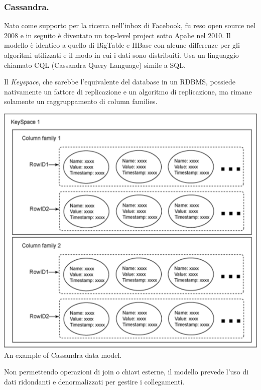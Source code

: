 \documentclass[a4page, 11pt]{article}
\begin{document}
\subsubsection*{Cassandra.}
Nato come supporto per la ricerca nell'inbox di Facebook, fu reso open source nel 2008 e in seguito è diventato un top-level project sotto Apahe nel 2010.
Il modello è identico a quello di BigTable e HBase con alcune differenze per gli algoritmi utilizzati e il modo in cui i dati sono distribuiti.
Usa un linguaggio chiamato CQL (Cassandra Query Language) simile a SQL.

Il \textit{Keyspace}, che sarebbe l'equivalente del database in un RDBMS, possiede nativamente un fattore di replicazione e un algoritmo di replicazione, ma rimane solamente un raggruppamento di column families.
\begin{center}
	\includegraphics[scale=0.5]{IMAGE5.png} \newline
	An example of Cassandra data model.
\end{center}

Non permettendo operazioni di join o chiavi esterne, il modello prevede l'uso di dati ridondanti e denormalizzati per gestire i collegamenti.
\end{document}
